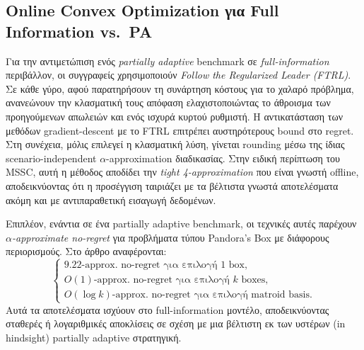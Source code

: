 \documentclass[11pt,a4paper]{article}
\begin{document}
\subsection*{Online Convex Optimization για Full Information vs.\ PA}
Για την αντιμετώπιση ενός \emph{partially adaptive} benchmark σε \emph{full-information} περιβάλλον, οι συγγραφείς χρησιμοποιούν \emph{Follow the Regularized Leader (FTRL)}. Σε κάθε γύρο, αφού παρατηρήσουν τη συνάρτηση κόστους για το χαλαρό πρόβλημα, ανανεώνουν την κλασματική τους απόφαση ελαχιστοποιώντας το άθροισμα των προηγούμενων απωλειών και ενός ισχυρά κυρτού ρυθμιστή. Η αντικατάσταση των μεθόδων gradient-descent με το FTRL επιτρέπει αυστηρότερους bound στο regret. Στη συνέχεια, μόλις επιλεγεί η κλασματική λύση, γίνεται rounding μέσω της ίδιας scenario-independent \(\alpha\)-approximation διαδικασίας. Στην ειδική περίπτωση του MSSC, αυτή η μέθοδος αποδίδει την \emph{tight 4-approximation} που είναι γνωστή offline, αποδεικνύοντας ότι η προσέγγιση ταιριάζει με τα βέλτιστα γνωστά αποτελέσματα ακόμη και με αντιπαραθετική εισαγωγή δεδομένων.

Επιπλέον, ενάντια σε ένα partially adaptive benchmark, οι τεχνικές αυτές παρέχουν \emph{$\alpha$-approximate no-regret} για προβλήματα τύπου Pandora’s Box με διάφορους περιορισμούς. Στο άρθρο αναφέρονται:
\[
\begin{cases}
\text{9.22-approx.\ no-regret για επιλογή 1 box},\\
O(1)\text{-approx.\ no-regret για επιλογή $k$ boxes},\\
O(\log k)\text{-approx.\ no-regret για επιλογή matroid basis}.
\end{cases}
\]
Αυτά τα αποτελέσματα ισχύουν στο full-information μοντέλο, αποδεικνύοντας σταθερές ή λογαριθμικές αποκλίσεις σε σχέση με μια βέλτιστη εκ των υστέρων (in hindsight) partially adaptive στρατηγική.
\end{document}
